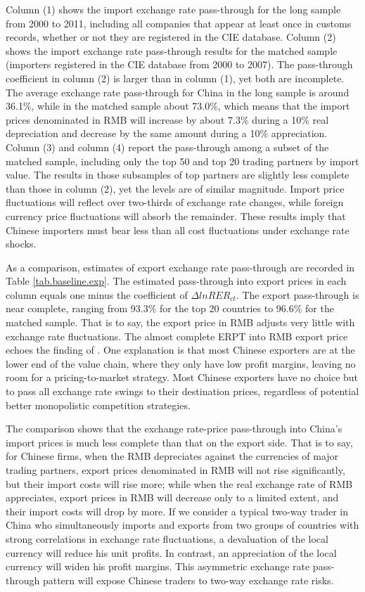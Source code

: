 \documentclass[12pt]{article}
\begin{document}
Column (1) shows the import exchange rate pass-through for the long sample from 2000 to 2011, including all companies that appear at least once in customs records, whether or not they are registered in the CIE database. Column (2) shows the import exchange rate pass-through results for the matched sample (importers registered in the CIE database from 2000 to 2007). The pass-through coefficient in column (2) is larger than in column (1), yet both are incomplete. The average exchange rate pass-through for China in the long sample is around 36.1\%, while in the matched sample about 73.0\%, which means that the import prices denominated in RMB will increase by about 7.3\% during a 10\% real depreciation and decrease by the same amount during a 10\% appreciation. Column (3) and column (4) report the pass-through among a subset of the matched sample, including only the top 50 and top 20 trading partners by import value. The results in those subsamples of top partners are slightly less complete than those in column (2), yet the levels are of similar magnitude. Import price fluctuations will reflect over two-thirds of exchange rate changes, while foreign currency price fluctuations will absorb the remainder. These results imply that Chinese importers must bear less than all cost fluctuations under exchange rate shocks. 

As a comparison, estimates of export exchange rate pass-through are recorded in Table \ref{tab.baseline.exp}. The estimated pass-through into export prices in each column equals one minus the coefficient of $\Delta lnRER_{ct}$. The export pass-through is near complete, ranging from 93.3\% for the top 20 countries to 96.6\% for the matched sample. That is to say, the export price in RMB adjusts very little with exchange rate fluctuations. The almost complete ERPT into RMB export price echoes the finding of \cite{lmx2015}. One explanation is that most Chinese exporters are at the lower end of the value chain, where they only have low profit margins, leaving no room for a pricing-to-market strategy. Most Chinese exporters have no choice but to pass all exchange rate swings to their destination prices, regardless of potential better monopolistic competition strategies.

The comparison shows that the exchange rate-price pass-through into China's import prices is much less complete than that on the export side. That is to say, for Chinese firms, when the RMB depreciates against the currencies of major trading partners, export prices denominated in RMB will not rise significantly, but their import costs will rise more; while when the real exchange rate of RMB appreciates, export prices in RMB will decrease only to a limited extent, and their import costs will drop by more. If we consider a typical two-way trader in China who simultaneously imports and exports from two groups of countries with strong correlations in exchange rate fluctuations, a devaluation of the local currency will reduce his unit profits. In contrast, an appreciation of the local currency will widen his profit margins. This asymmetric exchange rate pass-through pattern will expose Chinese traders to two-way exchange rate risks.
\end{document}
